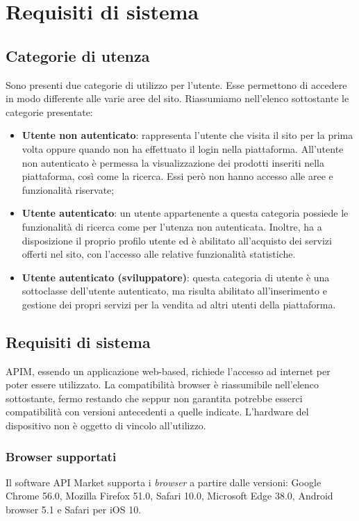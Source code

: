 \newpage
\section{Requisiti di sistema}

\subsection{Categorie di utenza}
Sono presenti due categorie di utilizzo per l'utente. Esse permettono di accedere in modo differente alle varie aree del sito. Riassumiamo nell'elenco sottostante le categorie presentate:

\begin{itemize}
	\item \textbf{Utente non autenticato}: rappresenta l'utente che visita il sito per la prima volta oppure quando non ha effettuato il login nella piattaforma. All'utente non autenticato è permessa la visualizzazione dei prodotti inseriti nella piattaforma, così come la ricerca. Essi però non hanno accesso alle aree e funzionalità riservate;
	\item \textbf{Utente autenticato}: un utente appartenente a questa categoria possiede le funzionalità di ricerca come per l'utenza non autenticata. Inoltre, ha a disposizione il proprio profilo utente ed è abilitato all'acquisto dei servizi offerti nel sito, con l'accesso alle relative funzionalità statistiche.
	\item \textbf{Utente autenticato (sviluppatore)}: questa categoria di utente è una sottoclasse dell'utente autenticato, ma risulta abilitato all'inserimento e gestione dei propri servizi per la vendita ad altri utenti della piattaforma. 
\end{itemize}

\subsection{Requisiti di sistema}
APIM, essendo un applicazione web-based, richiede l'accesso ad internet per poter essere utilizzato. La compatibilità browser è riassumibile nell'elenco sottostante, fermo restando che seppur non garantita potrebbe esserci compatibilità con versioni antecedenti a quelle indicate. L'hardware del dispositivo non è oggetto di vincolo all'utilizzo.

\subsubsection{Browser supportati}
Il software API Market supporta i \textit{browser} a partire dalle versioni: Google Chrome 56.0, Mozilla Firefox 51.0, Safari 10.0, Microsoft Edge 38.0, Android browser 5.1 e Safari per iOS 10.